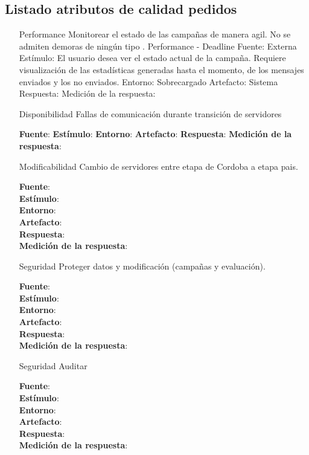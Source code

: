 \documentclass[a4paper, 11pt]{article}
\begin{document}
\subsection{Listado atributos de calidad pedidos}
\begin{itemize}
\item[Performance] Monitorear el estado de las campañas de manera agil. No se admiten demoras de ningún tipo .
Performance - Deadline
Fuente: Externa
Estímulo: El usuario desea ver el estado actual de la campaña. Requiere visualización de las estadísticas generadas hasta el momento, de los mensajes enviados y los no enviados. 
Entorno: Sobrecargado
Artefacto: Sistema
Respuesta: 
Medición de la respuesta: 

\item[Disponibilidad] Fallas de comunicación durante transición de servidores

\textbf{Fuente}: 
\textbf{Estímulo}:
\textbf{Entorno}: 
\textbf{Artefacto}: 
\textbf{Respuesta}: 
\textbf{Medición de la respuesta}: 

\item[Modificabilidad] Cambio de servidores entre etapa de Cordoba a etapa pais.

\textbf{Fuente}:  \\
\textbf{Estímulo}: \\
\textbf{Entorno}: \\
\textbf{Artefacto}: \\
\textbf{Respuesta}: \\
\textbf{Medición de la respuesta}: \\


\item[Seguridad]Proteger datos y modificación (campañas y evaluación).

\textbf{Fuente}:  \\
\textbf{Estímulo}: \\
\textbf{Entorno}: \\
\textbf{Artefacto}: \\
\textbf{Respuesta}: \\
\textbf{Medición de la respuesta}: \\

\item[Seguridad]Auditar


\textbf{Fuente}:  \\
\textbf{Estímulo}: \\
\textbf{Entorno}: \\
\textbf{Artefacto}: \\
\textbf{Respuesta}: \\
\textbf{Medición de la respuesta}: \\


\end{itemize}
\end{document}
